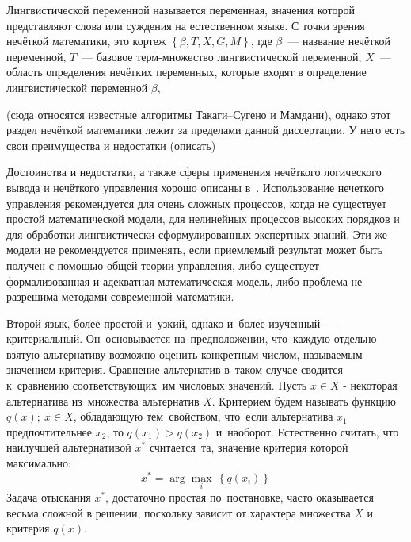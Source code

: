 \begin{mydef}
Лингвистической переменной называется переменная, значения которой представляют слова или суждения на естественном языке. С точки зрения нечёткой математики, это кортеж $\left\lbrace \beta, T, X, G, M \right\rbrace$, где $\beta$~--- название нечёткой переменной, $T$~--- базовое терм-множество лингвистической переменной, $X$~--- область определения нечётких переменных, которые входят в определение лингвистической переменной $\beta$,
\end{mydef}




 (сюда относятся известные алгоритмы Такаги--Сугено и Мамдани), однако этот раздел нечёткой математики лежит за пределами данной диссертации. У него есть свои преимущества и недостатки (описать)
 
Достоинства и недостатки, а также сферы применения нечёткого логического вывода и нечёткого управления хорошо описаны в~\cite{Bauer_Winkler}.
Использование нечеткого управления рекомендуется для очень сложных процессов, когда не существует простой математической модели, для нелинейных процессов высоких порядков и для обработки лингвистически сформулированных экспертных знаний. Эти же модели не рекомендуется применять, если приемлемый результат может быть получен с помощью общей теории управления, либо существует формализованная и адекватная математическая модель, либо проблема не разрешима методами современной математики.

Второй язык, более простой и~узкий, однако и~более изученный~--- критериальный. Он~основывается на~предположении, что~каждую отдельно взятую альтернативу возможно оценить конкретным числом, называемым значением критерия. Сравнение альтернатив в~таком случае сводится к~сравнению соответствующих~им числовых значений. Пусть $x\in X$ - некоторая альтернатива из~множества альтернатив $X$. Критерием будем называть функцию $q\left( x \right);\ x\in X$, обладающую тем~свойством, что~если альтернатива ${x_1}$ предпочтительнее ${x_2}$, то $q\left( x_1 \right)>q\left( x_2 \right)$ и~наоборот. Естественно считать, что наилучшей альтернативой ${{x}^{*}}$ считается~та, значение критерия которой максимально:
\begin{equation*}
  x^{*}=\arg \underset{i}{\mathop{\max }}\,\left\{ q\left( x_i \right) \right\}
\end{equation*}
Задача отыскания $x^{*}$, достаточно простая по~постановке, часто оказывается весьма сложной в решении, поскольку зависит от характера множества $X$ и критерия $q\left( x \right)$. 

